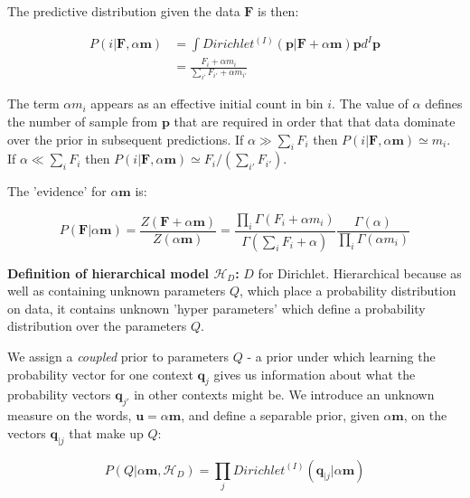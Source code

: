\noindent The predictive distribution given the data $\boldsymbol{F}$ is then:

\begin{align}
P(i|\boldsymbol{F},\alpha\boldsymbol{m}) &=\int Dirichlet^{(I)}(\boldsymbol{p}|\boldsymbol{F}+\alpha\boldsymbol{m})\boldsymbol{p}d^{I}\boldsymbol{p}
\\
&= \frac{F_{i}+\alpha m_{i}}{\sum_{i'}F_{i'}+\alpha m_{i'}}
\end{align}

\noindent The term $\alpha m_{i}$ appears as an effective initial count in bin $i$. The value of $\alpha$ defines the number of sample from $\boldsymbol{p}$ that are required in order that that data dominate over the prior in subsequent predictions. If $\alpha \gg \sum_{i}F_{i}$ then $P(i|\boldsymbol{F},\alpha\boldsymbol{m})\simeq m_{i}$. If $\alpha\ll\sum_{i}F_{i}$ then $P(i|\boldsymbol{F},\alpha\boldsymbol{m})\simeq F_{i}/\left(\sum_{i'}F_{i'}\right)$.

The 'evidence' for $\alpha\boldsymbol{m}$ is:

\begin{equation}
P(\boldsymbol{F}|\alpha\boldsymbol{m})=\frac{Z(\boldsymbol{F}+\alpha\boldsymbol{m})}{Z(\alpha\boldsymbol{m})}=\frac{\prod_{i}\Gamma(F_{i}+\alpha m_{i})}{\Gamma\left(\sum_{i}F_{i}+\alpha\right)}\frac{\Gamma(\alpha)}{\prod_{i}\Gamma(\alpha m_{i})}
\end{equation}

\textbf{Definition of hierarchical model $\mathscr{H}_{D}$: } $D$ for Dirichlet. Hierarchical because as well as containing unknown parameters $Q$, which place a probability distribution on data, it contains unknown 'hyper parameters' which define a probability distribution over the parameters $Q$.

We assign a \textit{coupled} prior to parameters $Q$ - a prior under which learning the probability vector for one context $\boldsymbol{q}_{j}$ gives us information about what the probability vectors $\boldsymbol{q}_{j'}$ in other contexts might be. We introduce an unknown measure on the words, $\boldsymbol{u}=\alpha\boldsymbol{m}$, and define a separable prior, given $\alpha\boldsymbol{m}$, on the vectors $\boldsymbol{q}_{|j}$ that make up $Q$:

\begin{equation}
P(Q|\alpha\boldsymbol{m}, \mathscr{H}_{D})=\prod_{j}Dirichlet^{(I)}(\boldsymbol{q}_{|j}|\alpha\boldsymbol{m})
\end{equation}

